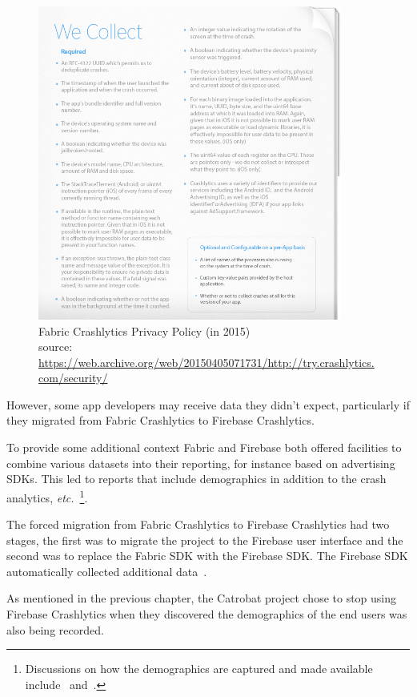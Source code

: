 \begin{figure}
    \centering
    \includegraphics[width=10cm]{images/fabric-crashlytics/crashlytics-privacy-policy-38154ffbd69ef44a478b54365dc9b3ad.png}
    \caption{Fabric Crashlytics Privacy Policy (in 2015)\\{source: \tiny \url{https://web.archive.org/web/20150405071731/http://try.crashlytics.com/security/}}}
    \label{fig:fabric-crashlytics-privacy-policy}
\end{figure}

However, some app developers may receive data they didn't expect, particularly if they migrated from Fabric Crashlytics to Firebase Crashlytics. 

To provide some additional context Fabric and Firebase both offered facilities to combine various datasets into their reporting, for instance based on advertising SDKs. This led to reports that include demographics in addition to the crash analytics, \emph{etc.}~\footnote{Discussions on how the demographics are captured and made available include~\citep{joe2016_firebase_analytics_demographics} and~\citep{chelo2020_firebase_does_not_collect_age_or_gender_data}.}. 

The forced migration from Fabric Crashlytics to Firebase Crashlytics had two stages, the first was to migrate the project to the Firebase user interface and the second was to replace the Fabric SDK with the Firebase SDK. The Firebase SDK automatically collected additional data~\citep{firebase_help_GA4_2021_predefined_user_dimensions}.

As mentioned in the previous chapter, the Catrobat project chose to stop using Firebase Crashlytics when they discovered the demographics of the end users was also being recorded. 
%

